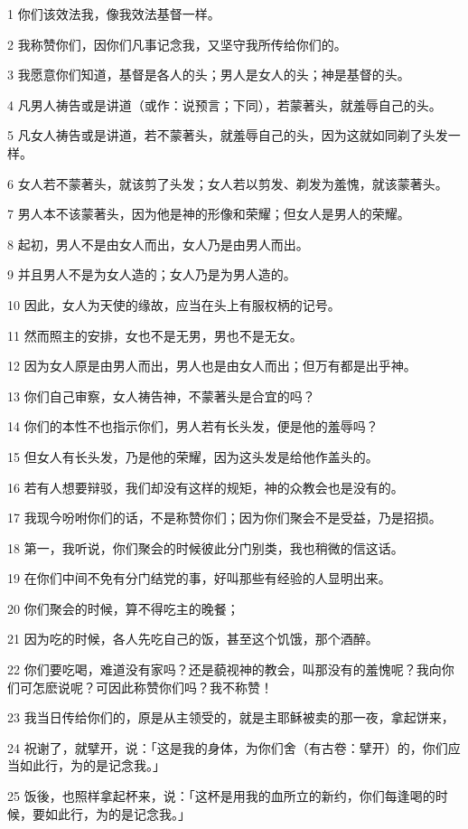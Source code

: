 \par 1 你们该效法我，像我效法基督一样。
\par 2 我称赞你们，因你们凡事记念我，又坚守我所传给你们的。
\par 3 我愿意你们知道，基督是各人的头；男人是女人的头；神是基督的头。
\par 4 凡男人祷告或是讲道（或作：说预言；下同），若蒙著头，就羞辱自己的头。
\par 5 凡女人祷告或是讲道，若不蒙著头，就羞辱自己的头，因为这就如同剃了头发一样。
\par 6 女人若不蒙著头，就该剪了头发；女人若以剪发、剃发为羞愧，就该蒙著头。
\par 7 男人本不该蒙著头，因为他是神的形像和荣耀；但女人是男人的荣耀。
\par 8 起初，男人不是由女人而出，女人乃是由男人而出。
\par 9 并且男人不是为女人造的；女人乃是为男人造的。
\par 10 因此，女人为天使的缘故，应当在头上有服权柄的记号。
\par 11 然而照主的安排，女也不是无男，男也不是无女。
\par 12 因为女人原是由男人而出，男人也是由女人而出；但万有都是出乎神。
\par 13 你们自己审察，女人祷告神，不蒙著头是合宜的吗？
\par 14 你们的本性不也指示你们，男人若有长头发，便是他的羞辱吗？
\par 15 但女人有长头发，乃是他的荣耀，因为这头发是给他作盖头的。
\par 16 若有人想要辩驳，我们却没有这样的规矩，神的众教会也是没有的。
\par 17 我现今吩咐你们的话，不是称赞你们；因为你们聚会不是受益，乃是招损。
\par 18 第一，我听说，你们聚会的时候彼此分门别类，我也稍微的信这话。
\par 19 在你们中间不免有分门结党的事，好叫那些有经验的人显明出来。
\par 20 你们聚会的时候，算不得吃主的晚餐；
\par 21 因为吃的时候，各人先吃自己的饭，甚至这个饥饿，那个酒醉。
\par 22 你们要吃喝，难道没有家吗？还是藐视神的教会，叫那没有的羞愧呢？我向你们可怎麽说呢？可因此称赞你们吗？我不称赞！
\par 23 我当日传给你们的，原是从主领受的，就是主耶稣被卖的那一夜，拿起饼来，
\par 24 祝谢了，就擘开，说：「这是我的身体，为你们舍（有古卷：擘开）的，你们应当如此行，为的是记念我。」
\par 25 饭後，也照样拿起杯来，说：「这杯是用我的血所立的新约，你们每逢喝的时候，要如此行，为的是记念我。」
